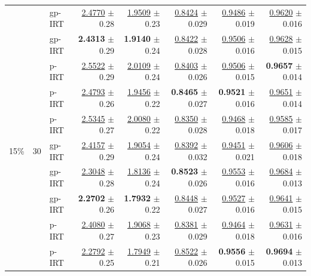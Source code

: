 \begin{longtable}{llp{}rrrrr}
 &  & gp-IRT & \underline{2.4770} {\scriptsize $\pm$ 0.28} & \underline{1.9509} {\scriptsize $\pm$ 0.23} & \underline{0.8424} {\scriptsize $\pm$ 0.029} & \underline{0.9486} {\scriptsize $\pm$ 0.019} & \underline{0.9620} {\scriptsize $\pm$ 0.016} \\
 &  & gp-IRT & \textbf{2.4313} {\scriptsize $\pm$ 0.29} & \textbf{1.9140} {\scriptsize $\pm$ 0.24} & \underline{0.8422} {\scriptsize $\pm$ 0.028} & \underline{0.9506} {\scriptsize $\pm$ 0.016} & \underline{0.9628} {\scriptsize $\pm$ 0.015} \\
 &  & p-IRT & \underline{2.5522} {\scriptsize $\pm$ 0.29} & \underline{2.0109} {\scriptsize $\pm$ 0.24} & \underline{0.8403} {\scriptsize $\pm$ 0.026} & \underline{0.9506} {\scriptsize $\pm$ 0.015} & \textbf{0.9657} {\scriptsize $\pm$ 0.014} \\
 &  & p-IRT & \underline{2.4793} {\scriptsize $\pm$ 0.26} & \underline{1.9456} {\scriptsize $\pm$ 0.22} & \textbf{0.8465} {\scriptsize $\pm$ 0.027} & \textbf{0.9521} {\scriptsize $\pm$ 0.016} & \underline{0.9651} {\scriptsize $\pm$ 0.014} \\
 &  & p-IRT & \underline{2.5345} {\scriptsize $\pm$ 0.27} & \underline{2.0080} {\scriptsize $\pm$ 0.22} & \underline{0.8350} {\scriptsize $\pm$ 0.028} & \underline{0.9468} {\scriptsize $\pm$ 0.018} & \underline{0.9585} {\scriptsize $\pm$ 0.017} \\
\midrule
15\% & 30 & gp-IRT & \underline{2.4157} {\scriptsize $\pm$ 0.29} & \underline{1.9054} {\scriptsize $\pm$ 0.24} & \underline{0.8392} {\scriptsize $\pm$ 0.032} & \underline{0.9451} {\scriptsize $\pm$ 0.021} & \underline{0.9606} {\scriptsize $\pm$ 0.018} \\
 &  & gp-IRT & \underline{2.3048} {\scriptsize $\pm$ 0.28} & \underline{1.8136} {\scriptsize $\pm$ 0.24} & \textbf{0.8523} {\scriptsize $\pm$ 0.026} & \underline{0.9553} {\scriptsize $\pm$ 0.016} & \underline{0.9684} {\scriptsize $\pm$ 0.013} \\
 &  & gp-IRT & \textbf{2.2702} {\scriptsize $\pm$ 0.26} & \textbf{1.7932} {\scriptsize $\pm$ 0.22} & \underline{0.8448} {\scriptsize $\pm$ 0.027} & \underline{0.9527} {\scriptsize $\pm$ 0.016} & \underline{0.9641} {\scriptsize $\pm$ 0.015} \\
 &  & p-IRT & \underline{2.4080} {\scriptsize $\pm$ 0.27} & \underline{1.9068} {\scriptsize $\pm$ 0.23} & \underline{0.8381} {\scriptsize $\pm$ 0.029} & \underline{0.9464} {\scriptsize $\pm$ 0.018} & \underline{0.9631} {\scriptsize $\pm$ 0.016} \\
 &  & p-IRT & \underline{2.2792} {\scriptsize $\pm$ 0.25} & \underline{1.7949} {\scriptsize $\pm$ 0.21} & \underline{0.8522} {\scriptsize $\pm$ 0.026} & \textbf{0.9556} {\scriptsize $\pm$ 0.015} & \textbf{0.9694} {\scriptsize $\pm$ 0.013} \\

\end{longtable}
